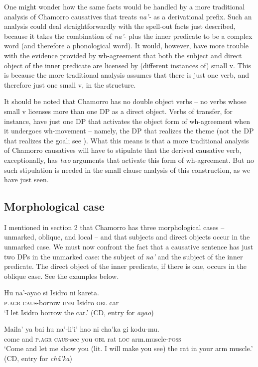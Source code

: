 \documentclass[output=paper,
modfonts
]{LSP/langsci}
\begin{document}
\begin{exe}
\begin{xlist}
One might wonder how the same facts would be handled by a more
traditional analysis of Chamorro causatives that treats \emph{na'-} as a
derivational prefix. Such an analysis could deal straightforwardly with
the spell-out facts just described, because it takes the combination of
\emph{na'}- plus the inner predicate to be a complex word (and therefore
a phonological word). It would, however, have more trouble with the
evidence provided by wh-agreement that both the subject and direct
object of the inner predicate are licensed by (different instances of)
small v. This is because the more traditional analysis assumes that
there is just one verb, and therefore just one small v, in the
structure.

It should be noted that Chamorro has no double object verbs -- no verbs
whose small v licenses more than one DP as a direct object. Verbs of
transfer, for instance, have just one DP that activates the object form
of wh-agreement when it undergoes wh-movement -- namely, the DP that
realizes the theme (not the DP that realizes the goal; see \citealt[161--163]{gibson1980}). What this means is that a more traditional analysis of
Chamorro causatives will have to stipulate that the derived causative
verb, exceptionally, has \emph{two} arguments that activate this form of
wh-agreement. But no such stipulation is needed in the small clause
analysis of this construction, as we have just seen.

\subsection{Morphological case}

I mentioned in section 2 that Chamorro has three morphological
cases -- unmarked, oblique, and local -- and that subjects and direct
objects occur in the unmarked case. We must now confront the fact that a
causative sentence has just two DPs in the unmarked case: the subject of
\emph{na'} and the subject of the inner predicate. The direct object of
the inner predicate, if there is one, occurs in the oblique case. See
the examples below.

\ea
\ea
\gll Hu na'-ayao si Isidro ni kareta.\\
\textsc{p.agr} \textsc{caus-}borrow \textsc{unm} Isidro \textsc{obl} car\\
\glt `I let Isidro borrow the car.' (CD, entry for \emph{ayao})

\ex \gll Maila' ya {bai hu} na'-li'i' hao ni cha'ka gi kodu-mu.\\
come and \textsc{p.agr} \textsc{caus-}see you \textsc{obl} rat \textsc{loc} arm.muscle-\textsc{poss}\\
\glt `Come and let me show you (lit. I will make you see) the rat in your arm muscle.' (CD, entry for \emph{chå'ka})
\z
\z


\end{xlist}
\end{exe}
\end{document}
